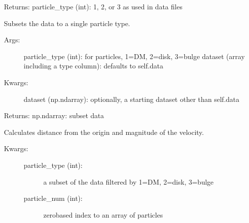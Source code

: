\documentclass[letterpaper,10pt,english]{sphinxmanual}
\begin{document}
\begin{fulllineitems}
\begin{fulllineitems}
Returns: particle\_type (int): 1, 2, or 3 as used in data files

\end{fulllineitems}


\begin{fulllineitems}
\label{\detokenize{galaxy:galaxy.galaxy.Galaxy.filter_by_type}}
Subsets the data to a single particle type.
\begin{description}
\item[{Args:}] \leavevmode
particle\_type (int): for particles, 1=DM, 2=disk, 3=bulge
dataset (array including a type column): defaults to self.data

\item[{Kwargs:}] \leavevmode
dataset (np.ndarray): optionally, a starting dataset other than self.data

\end{description}

Returns: np.ndarray: subset data

\end{fulllineitems}


\begin{fulllineitems}
\label{\detokenize{galaxy:galaxy.galaxy.Galaxy.single_particle_properties}}
Calculates distance from the origin and magnitude of the velocity.
\begin{description}
\item[{Kwargs:}] \leavevmode\begin{description}
\item[{particle\_type (int):}] \leavevmode
a subset of the data filtered by 1=DM, 2=disk, 3=bulge

\item[{particle\_num (int):}] \leavevmode
zero\sphinxhyphen{}based index to an array of particles

\end{description}


\end{description}
\end{fulllineitems}
\end{fulllineitems}
\end{document}
